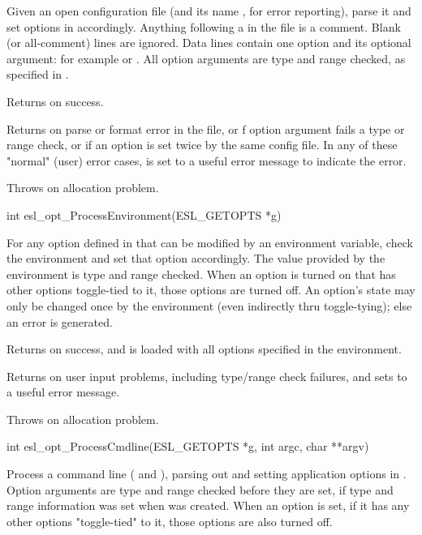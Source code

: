 \begin{sreapi}
Given an open configuration file  (and
its name , for error reporting),
parse it and set options in  accordingly.
Anything following a \ccode{\#} in the file is a
comment. Blank (or all-comment) lines are
ignored. Data lines contain one option and
its optional argument: for example 
or . All option arguments are type and
range checked, as specified in .

Returns  on success.  

Returns  on parse or format error in the
file, or f option argument fails a type or range check,
or if an option is set twice by the same config file.
In any of these "normal" (user) error cases, 
is set to a useful error message to indicate the error.

Throws  on allocation problem.            


\hypertarget{func:esl_opt_ProcessEnvironment()}
{\item[int esl\_opt\_ProcessEnvironment(ESL\_GETOPTS *g)]}

For any option defined in  that can be modified
by an environment variable, check the environment
and set that option accordingly. The value provided
by the environment is type and range checked.
When an option is turned on that has other options 
toggle-tied to it, those options are turned off.
An option's state may only be changed once by the
environment (even indirectly thru toggle-tying);
else an error is generated.

Returns  on success, and  is loaded with all
options specified in the environment.

Returns  on user input problems, 
including type/range check failures, and 
sets  to a useful error message.

Throws  on allocation problem.            


\hypertarget{func:esl_opt_ProcessCmdline()}
{\item[int esl\_opt\_ProcessCmdline(ESL\_GETOPTS *g, int argc, char **argv)]}

Process a command line ( and ), parsing out
and setting application options in . Option arguments
are type and range checked before they are set, if type
and range information was set when  was created.
When an option is set, if it has any other options
"toggle-tied" to it, those options are also turned off.


\end{sreapi}
